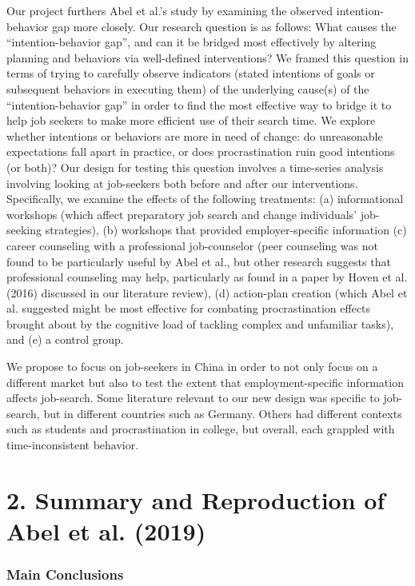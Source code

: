 \documentclass[]{elsarticle} %
\begin{document}
Our project furthers Abel et al.'s study by examining the observed
intention-behavior gap more closely. Our research question is as
follows: What causes the ``intention-behavior gap'', and can it be
bridged most effectively by altering planning and behaviors via
well-defined interventions? We framed this question in terms of trying
to carefully observe indicators (stated intentions of goals or
subsequent behaviors in executing them) of the underlying cause(s) of
the ``intention-behavior gap'' in order to find the most effective way
to bridge it to help job seekers to make more efficient use of their
search time. We explore whether intentions or behaviors are more in need
of change: do unreasonable expectations fall apart in practice, or does
procrastination ruin good intentions (or both)? Our design for testing
this question involves a time-series analysis involving looking at
job-seekers both before and after our interventions. Specifically, we
examine the effects of the following treatments: (a) informational
workshops (which affect preparatory job search and change individuals'
job-seeking strategies), (b) workshops that provided employer-specific
information (c) career counseling with a professional job-counselor
(peer counseling was not found to be particularly useful by Abel et al.,
but other research suggests that professional counseling may help,
particularly as found in a paper by Hoven et al. (2016) discussed in our
literature review), (d) action-plan creation (which Abel et al.
suggested might be most effective for combating procrastination effects
brought about by the cognitive load of tackling complex and unfamiliar
tasks), and (e) a control group.

We propose to focus on job-seekers in China in order to not only focus
on a different market but also to test the extent that
employment-specific information affects job-search. Some literature
relevant to our new design was specific to job-search, but in different
countries such as Germany. Others had different contexts such as
students and procrastination in college, but overall, each grappled with
time-inconsistent behavior.

\section{2. Summary and Reproduction of Abel et al.
(2019)}\label{summary-and-reproduction-of-abel_bridging_2019}

\subsubsection{Main Conclusions}\label{main-conclusions}
\end{document}

